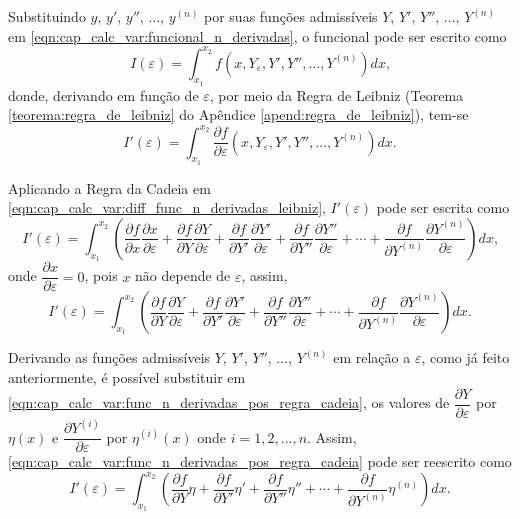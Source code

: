 \documentclass[
	12pt,				%
	openright,			%
    twoside,			%
	a4paper,			%
	english,			%
	french,				%
	spanish,			%
	brazil				%
	]{abntex2}
\numberwithin{lema}{chapter}
\numberwithin{teorema}{chapter}
\numberwithin{definicao}{chapter}
\numberwithin{exemplo}{chapter}
\numberwithin{figure}{chapter}
\begin{document}
Substituindo $y$, $y'$, $y''$, $\dots$, $y^{(n)}$ por suas funções admissíveis $Y$, $Y'$, $Y''$, $\dots$, $Y^{(n)}$ em \eqref{eqn:cap_calc_var:funcional_n_derivadas}, o funcional pode ser escrito como
$$
	I(\varepsilon) = \int_{x_1}^{x_2}
		f(x, Y_{\varepsilon}, Y', Y'', \dots, Y^{(n)})
		dx
	\text{,}
$$
donde, derivando em função de $\varepsilon$, por meio da Regra de Leibniz (Teorema \ref{teorema:regra_de_leibniz} do Apêndice \ref{apend:regra_de_leibniz}), tem-se
\begin{equation}
	\label{eqn:cap_calc_var:diff_func_n_derivadas_leibniz}
	I'(\varepsilon) = 
	\int_{x_1}^{x_2}
		\frac{\partial f}{\partial \varepsilon}
		(x, Y_{\varepsilon}, Y', Y'', \dots, Y^{(n)})
		dx
	\text{.}
\end{equation}

Aplicando a Regra da Cadeia em \eqref{eqn:cap_calc_var:diff_func_n_derivadas_leibniz}, $I'(\varepsilon)$ pode ser escrita como
$$
	I'(\varepsilon)=\int_{x_1}^{x_2}
	\left (
		\frac{\partial f}{\partial x}
		\frac{\partial x}{\partial \varepsilon}
		+
		\frac{\partial f}{\partial Y}
		\frac{\partial Y}{\partial \varepsilon}
		+
		\frac{\partial f}{\partial Y'}
		\frac{\partial Y'}{\partial \varepsilon}
		+
		\frac{\partial f}{\partial Y''}
		\frac{\partial Y''}{\partial \varepsilon}
		+
		\cdots
		+
		\frac{\partial f}{\partial Y^{(n)}}
		\frac{\partial Y^{(n)}}{\partial \varepsilon}
	\right ) dx
	\text{,}
$$
onde $\dfrac{\partial x}{\partial \varepsilon} = 0$, pois $x$ não depende de $\varepsilon$, assim,
\begin{equation}
	\label{eqn:cap_calc_var:func_n_derivadas_pos_regra_cadeia}
	I'(\varepsilon)=\int_{x_1}^{x_2}
	\left (
		\frac{\partial f}{\partial Y}
		\frac{\partial Y}{\partial \varepsilon}
		+
		\frac{\partial f}{\partial Y'}
		\frac{\partial Y'}{\partial \varepsilon}
		+
		\frac{\partial f}{\partial Y''}
		\frac{\partial Y''}{\partial \varepsilon}
		+
		\cdots
		+
		\frac{\partial f}{\partial Y^{(n)}}
		\frac{\partial Y^{(n)}}{\partial \varepsilon}
	\right ) dx
	\text{.}
\end{equation}

Derivando as funções admissíveis $Y$, $Y'$, $Y''$, $\dots$, $Y^{(n)}$ em relação a $\varepsilon$, como já feito anteriormente, é possível substituir em \eqref{eqn:cap_calc_var:func_n_derivadas_pos_regra_cadeia}, os valores de $\dfrac{\partial Y}{\partial \varepsilon}$ por $\eta(x)$ e $\dfrac{\partial Y^{(i)}}{\partial \varepsilon}$ por $\eta^{(i)}(x)$ onde $i=1, 2, \dots, n$. Assim, \eqref{eqn:cap_calc_var:func_n_derivadas_pos_regra_cadeia} pode ser reescrito como
\begin{equation}
	\label{eqn:cap_calc_var:func_n_derivadas_replace_0}
	I'(\varepsilon)=
	\int_{x_1}^{x_2} \left (
		\frac{\partial f}{\partial Y} \eta
		+
		\frac{\partial f}{\partial Y'} \eta'
		+
		\frac{\partial f}{\partial Y''} \eta''
		+
		\cdots
		+
		\frac{\partial f}{\partial Y^{(n)}} \eta^{(n)}
	\right ) dx
	\text{.}
\end{equation}
\end{document}
